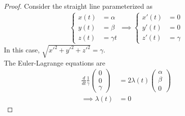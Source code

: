 \documentclass{article}
\begin{document}
	\begin{proof}
		Consider the straight line parameterized as 
		\begin{align}
			\begin{cases}
				x(t) &= \alpha \\
				y(t) &= \beta \\
				z(t) &= \gamma t
			\end{cases} \implies 
			\begin{cases}
				x'(t) &= 0 \\
				y'(t) &= 0 \\
				z'(t) &= \gamma
			\end{cases}
		\end{align}
		In this case, $\sqrt{x'^2 + y'^2 + z'^2} = \gamma$. \\
		The Euler-Lagrange equations are
		\begin{align}
			\frac{d}{dt} \frac{1}{\gamma} \begin{pmatrix}
				0 \\ 0 \\ \gamma
			\end{pmatrix} &= 2 \lambda(t) \begin{pmatrix}
				\alpha \\ \beta \\ 0
			\end{pmatrix} \\
			\implies \lambda(t) &= 0
		\end{align}
	\end{proof}
	
\end{document}
